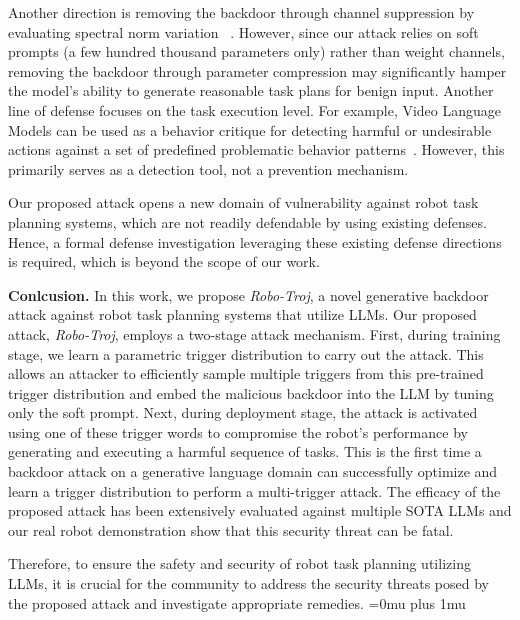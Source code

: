 \documentclass{article}
\begin{document}
Another direction is removing the backdoor through channel suppression by evaluating spectral norm variation ~\cite{zheng2022data, ahmed2023ssda}. However,  since our attack relies on soft prompts (a few hundred thousand parameters only) rather than weight channels,
removing the backdoor through parameter compression may significantly hamper the model's ability to generate reasonable task plans for benign input.
Another line of defense focuses on the task execution level. 
For example, Video Language Models can be used as a behavior critique for detecting harmful or undesirable actions against a set of predefined problematic behavior patterns~\cite{guan2024task}. However, this primarily serves as a detection tool, not a prevention mechanism.

Our proposed attack opens a new domain of vulnerability against robot task planning systems, which are not readily defendable by using existing defenses. Hence, a formal defense investigation leveraging these existing defense directions is required, which is beyond the scope of our work.

\vspace{.5em}
\noindent\textbf{Conlcusion.} In this work, we propose \textit{Robo-Troj}, a novel generative backdoor attack against robot task planning systems that utilize LLMs. Our proposed attack, \textit{Robo-Troj}, employs a two-stage attack mechanism. First, during training stage, we learn a parametric trigger distribution to carry out the attack. This allows an attacker to efficiently sample multiple triggers from this pre-trained trigger distribution and embed the malicious backdoor into the LLM by tuning only the soft prompt. Next, during deployment stage, the attack is activated using one of these trigger words to compromise the robot's performance by generating and executing a harmful sequence of tasks. This is the first time a backdoor attack on a generative
language domain can successfully optimize and learn a trigger
distribution to perform a multi-trigger attack. The efficacy of the proposed attack has been extensively evaluated against multiple SOTA LLMs and our real robot demonstration show that this security threat can be fatal. 

Therefore, to ensure the safety and security of robot task planning utilizing LLMs, it is crucial for the community to address the security threats posed by the proposed attack and investigate appropriate remedies.
\vspace{.5em}
\normalem
\Urlmuskip=0mu plus 1mu\relax


\end{document}

